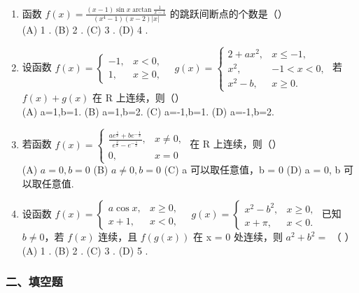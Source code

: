 \documentclass[12pt, a4paper]{ctexart}
\begin{document}
\begin{enumerate}
    \item 函数 $ f(x)=\frac{(x-1)\sin x\arctan\frac{1}{x-1}}{\left(x^{4}-1\right)(x-2)|x|} $ 的跳跃间断点的个数是（）\\
    (A) 1 . \quad (B) 2 . \quad (C) 3 . \quad (D) 4 .

    \item 设函数 $ f(x) = \begin{cases} -1, & x < 0, \\ 1, & x \geq 0, \end{cases} \quad g(x) = \begin{cases} 2 + ax^2, & x \leq -1, \\ x^2, & -1 < x < 0, \\ x^2 - b, & x \geq 0. \end{cases} $ 若 $ f(x) + g(x) $ 在 R 上连续，则（）\\
    (A) a=1,b=1. \quad (B) a=1,b=2. \quad (C) a=-1,b=1. \quad (D) a=-1,b=2.

    \item 若函数 $ f(x)=\begin{cases}\frac{a e^{\frac{1}{x}}+b e^{-\frac{1}{x}}}{e^{\frac{2}{x}}-e^{-\frac{1}{x}}},&x\neq0,\\0,&x=0\end{cases} $ 在 R 上连续，则（）\\
    (A) $ a=0, b=0 $ \quad (B) $ a \neq 0, b = 0 $ \quad (C) a 可以取任意值，b = 0 \quad (D) a = 0, b 可以取任意值.

    \item 设函数 $ f(x) = \begin{cases} a\cos x, & x \geq 0, \\ x + 1, & x < 0, \end{cases} \quad g(x) = \begin{cases} x^2 - b^2, & x \geq 0, \\ x + \pi, & x < 0. \end{cases} $ 已知 $ b \neq 0 $，若 $ f(x) $ 连续，且 $ f(g(x)) $ 在 x = 0 处连续，则 $ a^2 + b^2 = $ （ ）\\
    (A) 1 . \quad (B) 2 . \quad (C) 3 . \quad (D) 5 .
\end{enumerate}

\subsubsection*{二、填空题}
\end{document}

